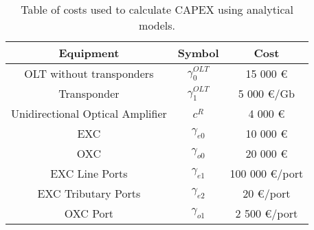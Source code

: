 \begin{table}[h!]
\centering
\begin{tabular}{|| c | c | c ||}
 \hline
 Equipment & Symbol & Cost \\
 \hline\hline
 OLT without transponders & $\gamma_0^{OLT}$ & 15 000 \euro \\
 Transponder & $\gamma_1^{OLT}$ & 5 000 \euro/Gb \\
 Unidirectional Optical Amplifier & $c^R$ & 4 000 \euro \\
 EXC & $\gamma_{e0}$ & 10 000 \euro \\
 OXC & $\gamma_{o0}$ & 20 000 \euro \\
 EXC Line Ports & $\gamma_{e1}$ & 100 000 \euro /port\\
 EXC Tributary Ports & $\gamma_{e2}$ & 20 \euro /port\\
 OXC Port & $\gamma_{o1}$ & 2 500 \euro /port \\
 \hline
\end{tabular}
\caption{Table of costs used to calculate CAPEX using analytical models.}
\label{table_cost_analytical}
\end{table}

